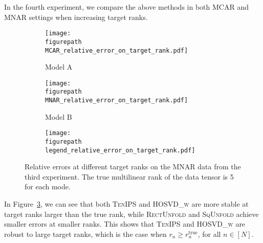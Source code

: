 \documentclass{article}
\theoremstyle{plain}
\def \figurepath {figures/}
\begin{document}
In the fourth experiment, we compare the above methods in both MCAR and MNAR settings when increasing target ranks.
\begin{figure}
	\centering
\centering
	\begin{subfigure}[t]{.26\linewidth}
	\texttt{[image: \\figurepath MCAR\_relative\_error\_on\_target\_rank.pdf]}
	\caption{Model A}
\label{fig:MCAR_relative_error_on_target_rank}
\end{subfigure}	
\hspace{.2\linewidth}
\begin{subfigure}[t]{.26\linewidth}
	\texttt{[image: \\figurepath MNAR\_relative\_error\_on\_target\_rank.pdf]}
	\caption{Model B}
\label{fig:MNAR_relative_error_on_target_rank}
\end{subfigure}

\begin{subfigure}[t]{.7\linewidth}
	\texttt{[image: \\figurepath legend\_relative\_error\_on\_target\_rank.pdf]}
\end{subfigure}

	\caption{Relative errors at different target ranks on the MNAR data from the third experiment. 
	The true multilinear rank of the data tensor is 5 for each mode.}
	\label{fig:exp_on_varying_ranks}
\end{figure}
In Figure~\ref{fig:exp_on_varying_ranks}, we can see that both \textsc{TenIPS} and \textsc{HOSVD\_w} are more stable at target ranks larger than the true rank, while \textsc{RectUnfold} and \textsc{SqUnfold} achieve smaller errors at smaller ranks. 
This shows that \textsc{TenIPS} and \textsc{HOSVD\_w} are robust to large target ranks, which is the case when $r_n \geq r_n^\mathrm{true}$, for all $n \in [N]$. 
\end{document}
